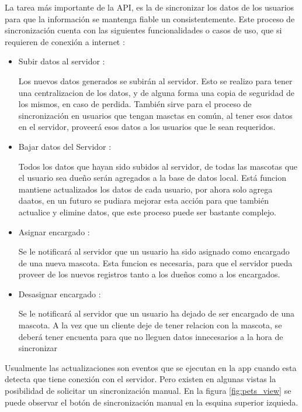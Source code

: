 La tarea más importante de la API, es la de sincronizar los datos de los usuarios para que la información se mantenga fiable un consistentemente. Este proceso de sincronización cuenta con las siguientes funcionalidades o casos de uso, que si requieren de conexión a internet :
\begin{itemize}
	\item Subir datos al servidor :
	
	Los nuevos datos generados se subirán al servidor. Esto se realizo para tener una centralizacion de los datos, y de alguna forma una copia de seguridad de los mismos, en caso de perdida. También sirve para el proceso de sincronización en usuarios que tengan masctas en común, al tener esos datos en el servidor, proveerá esos datos a los usuarios que le sean requeridos.
	
	\item Bajar datos del Servidor :
	
	Todos los datos que hayan sido subidos al servidor, de todas las mascotas que el usuario sea dueño serán agregados a la base de datos local. Está funcion mantiene actualizados los datos de cada usuario, por ahora solo agrega daatos, en un futuro se pudiara mejorar esta acción para que también actualice y elimine datos, que este proceso puede ser bastante complejo. 
	
	\item Asignar encargado :
	
	Se le notificará al servidor que un usuario ha sido asignado como encargado de una nueva mascota. Esta funcion es necesaria, para que el servidor pueda proveer de los nuevos registros tanto a los dueños como a los encargados.
	
		\item Desasignar encargado :
	
	Se le notificará al servidor que un usuario ha dejado de ser  encargado de una mascota. A la vez que un cliente deje de tener relacion con la mascota, se deberá tener encuenta para que no lleguen datos innecesarios a la hora de sincronizar   
\end{itemize}
Usualmente las actualizaciones son eventos que se ejecutan en la app cuando esta detecta que tiene conexión con el servidor. Pero existen en algunas vistas la posibilidad de solicitar un sincronización manual. En la figura \ref{fig:pets_view} se puede observar el botón de sincronización manual en la esquina superior izquieda.
